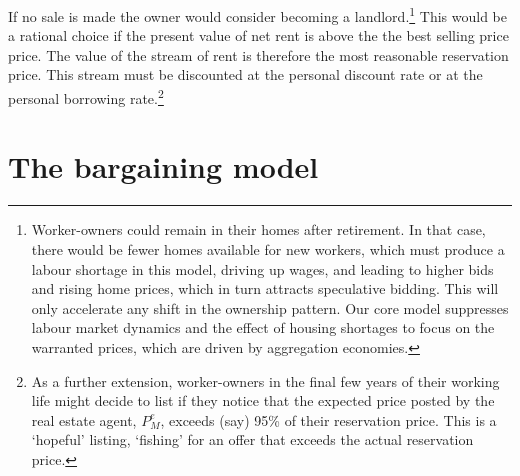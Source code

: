 {{If no sale is made the owner would consider becoming a landlord.\footnote{Worker-owners could remain in their homes after retirement. In that case,  there would be fewer homes available for new workers, which must produce a labour shortage in this model, driving up wages, and leading to higher bids and rising home prices, which in turn attracts  speculative bidding. This will only accelerate any shift in the ownership pattern. Our core model suppresses labour market dynamics and the effect of housing shortages to focus on the warranted prices, which are driven by aggregation economies.}  This would be a rational choice if the present value of net rent is above the the best selling price price. 
The value of the stream of rent is therefore the most reasonable reservation price. This stream must be discounted at the personal discount rate or at the personal borrowing rate.\footnote{As a further extension, worker-owners in the final few years of their working life might decide to list if they notice that the expected price posted by the real estate agent, $P_M^e$,  exceeds (say) 95\% of their reservation price. This is a `hopeful' listing, `fishing' for an offer that exceeds the actual reservation price.}






\section{The bargaining model} \label{sec_model_bargaining}

\begin{figure}[!hb]
\centering
{}
\end{figure}}}
